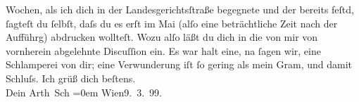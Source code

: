 \begin{ledgroupsized}[t]{13cm}
               Wochen, als ich dich in der Landesgerichtsſtraße
               begegnete und der \label{K_L00903-2v}\label{K_L00903-2h} bereits feſtd, ſagteſt du ſelbſt, daſs du es erſt im Mai (alſo eine beträchtliche Zeit
               nach der Aufführg) abdrucken wollteſt.\pend
           \pstart
           Wozu alſo läßt du dich in die von mir von vornherein abgelehnte Discuſſion ein. Es
               war halt eine, na ſagen wir, eine Schlamperei von {\pb}dir; eine Verwunderung iſt ſo gering als mein Gram, und damit Schluſs.\pend
           \pstart
           Ich grüß dich beſtens.{\\[\baselineskip]}Dein \spacefill\mbox{Arth Sch}\pend
           \leftskip=0em{}\pstart
           Wien9. 3. 99.\pend
           
         
         \endnumbering{}\end{ledgroupsized}  \newcommand{\dateiname}{L00903}\newcommand{\titel}{Arthur Schnitzler an Hermann Bahr, 9. 3. 1899}\newcommand{\editorInnen}{ Kurt Ifkovits,  Martin Anton Müller}
      